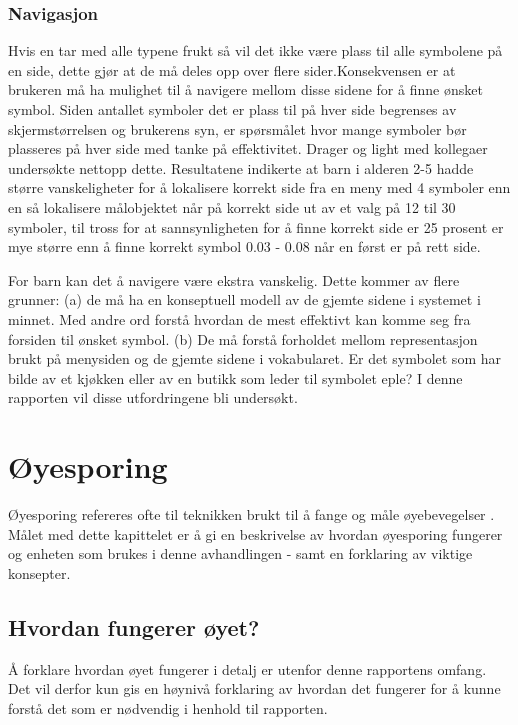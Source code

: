 \documentclass[phd,tocprelim]{cornell}
\begin{document}
\subsection{Navigasjon}
\label{subsec:navigasjon}

Hvis en tar med alle typene frukt så vil det ikke være plass til alle symbolene på en side, dette gjør at de må deles opp over flere sider.Konsekvensen er at brukeren må ha mulighet til å navigere mellom disse sidene for å finne ønsket symbol. Siden antallet symboler det er plass til på hver side begrenses av skjermstørrelsen og brukerens syn, er spørsmålet hvor mange symboler bør plasseres på hver side med tanke på effektivitet. Drager og light med kollegaer undersøkte nettopp dette. Resultatene indikerte at barn i alderen 2-5 hadde større vanskeligheter for å lokalisere korrekt side fra en meny med 4 symboler enn en så lokalisere målobjektet når på korrekt side ut av et valg på 12 til 30 symboler, til tross for at sannsynligheten for å finne korrekt side er 25 prosent er mye større enn å finne korrekt symbol 0.03 - 0.08 når en først er på rett side.

For barn kan det å navigere være ekstra vanskelig. Dette kommer av flere grunner: (a) de må ha en konseptuell modell av de gjemte sidene i systemet i minnet. Med andre ord forstå hvordan de mest effektivt kan komme seg fra forsiden til ønsket symbol. (b) De må forstå forholdet mellom representasjon brukt på menysiden og de gjemte sidene i vokabularet. Er det symbolet som har bilde av et kjøkken eller av en butikk som leder til symbolet eple? I denne rapporten vil disse utfordringene bli undersøkt.




\chapter{Øyesporing}

Øyesporing refereres ofte til teknikken brukt til å fange og måle øyebevegelser \cite{Calibration}. Målet med dette kapittelet er å gi en beskrivelse av hvordan øyesporing fungerer og enheten som brukes i denne avhandlingen - samt en forklaring av viktige konsepter.


\section{Hvordan fungerer øyet?}

Å forklare hvordan øyet fungerer i detalj er utenfor denne rapportens omfang. Det vil derfor kun gis en høynivå forklaring av hvordan det fungerer for å kunne forstå det som er nødvendig i henhold til rapporten. 
\end{document}

